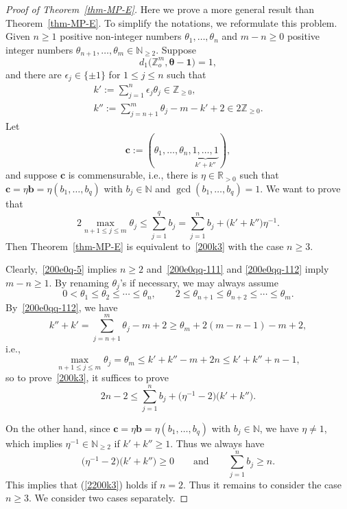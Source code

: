 \documentclass[10pt,a4paper]{amsart}
\numberwithin{equation}{section}
\def\N{\mathbb N}
\def\Z{\mathbb Z}
\begin{document}
\begin{proof}[Proof of Theorem~\ref{thm-MP-E}]
Here we prove a more general result than Theorem~\ref{thm-MP-E}. To
simplify the notations, we reformulate this problem. Given $n\geq 1$
positive non-integer numbers $\theta_1,\dots,\theta_n$ and $m-n\geq
0$ positive integer numbers $\theta_{n+1},\dots,\theta_{m}\in\N_{\geq
 2}$.
Suppose
\begin{equation}\label{200e0q-5}
d_1\bigl(\Z_o^{m},{\boldsymbol\theta-\boldsymbol 1}\bigr)=1,
\end{equation}
and there are $\epsilon_{j}\in\{\pm 1\}$ for $1\leq j\leq n$ such that
\begin{gather}\label{200e0qq-111}
k':=\sum_{j=1}^n \epsilon_{j}\theta_{j}\in\mathbb{Z}_{\geq 0},
\\ \label{200e0qq-112}
k'':=\sum_{j=n+1}^m \theta_{j}-m-k'+2\in 2\mathbb{Z}_{\geq 0}.
\end{gather}
Let
\[
 \boldsymbol c:=(\theta_1,\dots,\theta_{n},
 \underbrace{1,\dots,1}_{k'+k''}),
\]
and suppose $\boldsymbol c$ is commensurable, i.e., there is $\eta\in\mathbb{R}_{>0}$ such that $\mathbf{c}=\eta\mathbf{b}=\eta(b_1,\dots,b_q)$ with $b_j\in\mathbb{N}$ and $\gcd (b_1,\dots,b_q)=1$.
We want to prove that
\begin{equation}\label{200k3}2\max_{n+1\leq j\leq m}\theta_j\leq \sum_{j=1}^q b_j=\sum_{j=1}^nb_j+\bigl(k'+k''\bigr)\eta^{-1}.\end{equation}
Then Theorem~\ref{thm-MP-E} is equivalent to~\eqref{200k3} with the case $n\geq 3$.

Clearly,~\eqref{200e0q-5} implies $n\geq 2$ and~\eqref{200e0qq-111} and \eqref{200e0qq-112} imply $m-n\geq 1$. By renaming $\theta_j$'s if necessary, we may always assume
\[0<\theta_1\leq \theta_2\leq\cdots\leq \theta_n,\qquad 2\leq\theta_{n+1}\leq \theta_{n+2}\leq\cdots\leq \theta_m.\]
By~\eqref{200e0qq-112}, we have
\[k''+k'=\sum_{j=n+1}^m \theta_{j}-m+2\geq \theta_{m}+2(m-n-1)-m+2,\]
i.e.,
\[\max_{n+1\leq j\leq m}\theta_j=\theta_m\leq k'+k''-m+2n\leq k'+k''+n-1,\]
so to prove~\eqref{200k3}, it suffices to prove
\begin{equation}\label{2200k3}2n-2\leq \sum_{j=1}^n b_j+\bigl(\eta^{-1}-2\bigr)\bigl(k'+k''\bigr).\end{equation}

On the other hand, since
$\mathbf{c}=\eta\mathbf{b}=\eta(b_1,\dots,b_q)$ with
$b_j\in\mathbb{N}$, we have $\eta\neq 1$, which implies
$\eta^{-1}\in\mathbb{N}_{\geq 2}$ if $k'+k''\geq 1$. Thus we always
have
\[
 \bigl(\eta^{-1}-2\bigr)\bigl(k'+k''\bigr)\geq 0\qquad\text{and}\qquad \sum_{j=1}^n
 b_j\geq n.
\]
This implies that (\ref{2200k3}) holds if $n=2$. Thus it remains to consider the case $n\geq 3$. We consider two cases separately.


\end{proof}
\end{document}
